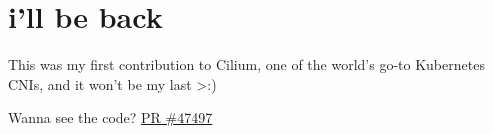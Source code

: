 
\section{i'll be back}

This was my first contribution to Cilium, one of the world's go-to Kubernetes CNIs, and it won't be my last >:)

Wanna see the code? \href{https://github.com/cilium/cilium/pull/47497}{PR \#47497}


